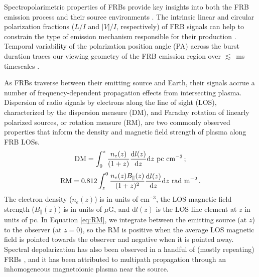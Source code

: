 \documentclass[twocolumn, linenumbers]{aastex701}
\begin{document}
Spectropolarimetric properties of FRBs provide key insights into both the FRB emission process and their source environments \citep[e.g.,][]{2024ApJ...968...50P, Sherman_2024_ApJ, Scott_2025_PASA}. The intrinsic linear and circular polarization fractions ($L/I$ and $|V|/I$, respectively) of FRB signals can help to constrain the type of emission mechanism responsible for their production \citep[e.g.,][]{2023MNRAS.522.2448Q}. Temporal variability of the polarization position angle (PA) across the burst duration traces our viewing geometry of the FRB emission region over $\lesssim$~ms timescales \citep[often parameterized as the ``rotating vector model'' or ``RVM'' that is applied to radio pulsar emission and to some FRBs, e.g.,][]{1969ApL.....3..225R, 2023MNRAS.520.4801J, 2025Natur.637...43M}. 

As FRBs traverse between their emitting source and Earth, their signals accrue a number of frequency-dependent propagation effects from intersecting plasma. Dispersion of radio signals by electrons along the line of sight (LOS), characterized by the dispersion measure (DM), and Faraday rotation of linearly polarized sources, or rotation measure (RM), are two commonly observed properties that inform the density and magnetic field strength of plasma along FRB LOSs.
\begin{equation}
{\rm{DM}}= \int_{0}^{z} \frac{n_e(z)}{(1+z)} \frac{\mathrm{d}l(z)}{\mathrm{d}z}\mathrm{d}z~\mathrm{pc}~\mathrm{cm}^{-3} \label{eq:DM} \,;
\end{equation}
\begin{equation}
{\rm{RM}} = 0.812 \int_{z}^{0} \frac{n_e(z) B_\parallel(z)}{(1 + z)^2}\frac{\mathrm{d}l(z)}{\mathrm{d}z}\mathrm{d}z~\mathrm{rad}~\mathrm{m}^{-2} \label{eq:RM} \,.
\end{equation}
The electron density ($n_e(z)$) is in units of cm$^{-3}$, the LOS magnetic field strength ($B_\parallel(z)$) is in units of $\mu$G, and $\mathrm{d}l(z)$ is the LOS line element at $z$ in units of pc. In Equation \ref{eq:RM}, we integrate between the emitting source (at $z$) to the observer (at $z=0$), so the RM is positive when the average LOS magnetic field is pointed towards the observer and negative when it is pointed away. Spectral depolarization has also been observed in a handful of (mostly repeating) FRBs \citep{2022Sci...375.1266F, 2025MNRAS.tmp.1894U, 2024ApJ...968...50P, 2026ApJ..1000L..53P}, and it has been attributed to multipath propagation through an inhomogeneous magnetoionic plasma near the source.
\end{document}
